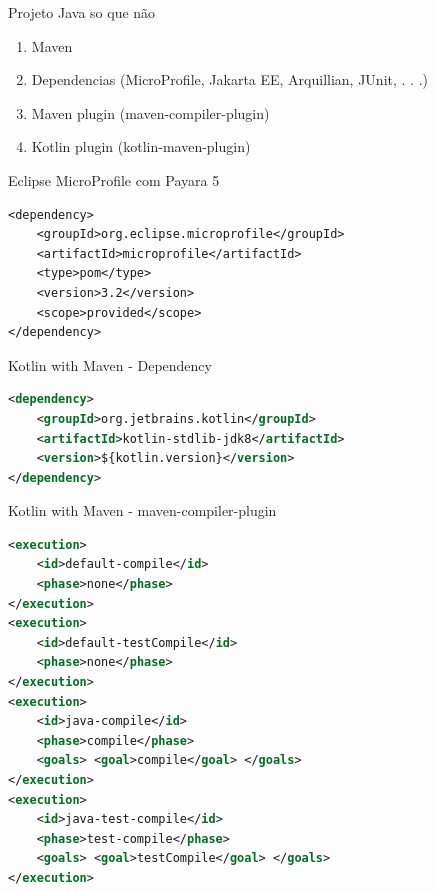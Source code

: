 \documentclass[aspectratio=169]{beamer}
\begin{document}
\begin{frame}{Projeto Java so que não}
\begin{enumerate}
	\item Maven
	\item Dependencias (MicroProfile, Jakarta EE, Arquillian, JUnit, . . .)
	\item Maven plugin (maven-compiler-plugin)
	\item Kotlin plugin (kotlin-maven-plugin)
\end{enumerate}
\end{frame}


\begin{frame}[fragile]{Eclipse MicroProfile com Payara 5}
\begin{lstlisting}
<dependency>
	<groupId>org.eclipse.microprofile</groupId>
	<artifactId>microprofile</artifactId>
	<type>pom</type>
	<version>3.2</version>
	<scope>provided</scope>
</dependency>
\end{lstlisting}
\end{frame}


\begin{frame}[fragile]{Kotlin with Maven - Dependency}
\begin{lstlisting}[language=XML]
<dependency>
	<groupId>org.jetbrains.kotlin</groupId>
	<artifactId>kotlin-stdlib-jdk8</artifactId>
	<version>${kotlin.version}</version>
</dependency>
\end{lstlisting}
\end{frame}

\begin{frame}[fragile]{Kotlin with Maven - maven-compiler-plugin}
\begin{lstlisting}[language=xml,
basicstyle=\tiny, %or \small or \footnotesize etc.
]
<execution>
	<id>default-compile</id>
	<phase>none</phase>
</execution>
<execution>
	<id>default-testCompile</id>
	<phase>none</phase>
</execution>
<execution>
	<id>java-compile</id>
	<phase>compile</phase>
	<goals> <goal>compile</goal> </goals>
</execution>
<execution>
	<id>java-test-compile</id>
	<phase>test-compile</phase>
	<goals> <goal>testCompile</goal> </goals>
</execution>
\end{lstlisting}
\end{frame}
\end{document}
